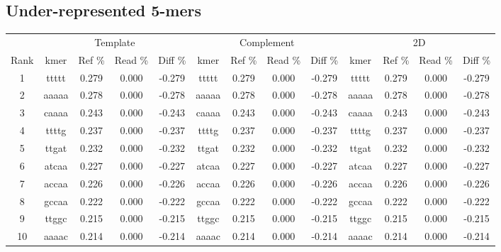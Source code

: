 \documentclass[a4paper,11pt,oneside]{article}
\begin{document}
\subsection*{Under-represented 5-mers}
\vspace{-3mm}
\begin{table}[H]
{\footnotesize
\fontsize{7pt}{9pt}\selectfont
\begin{tabular}{|c|c c c c|c c c c|c c c c|}
\cline{1-13}
 & \multicolumn{4}{c|}{Template} & \multicolumn{4}{c|}{Complement} & \multicolumn{4}{c|}{2D} \\
Rank & kmer & Ref \% & Read \% & Diff \% & kmer & Ref \% & Read \% & Diff \% & kmer & Ref \% & Read \% & Diff \% \\
\cline{1-13}
1 & ttttt & 0.279 & 0.000 & -0.279 & ttttt & 0.279 & 0.000 & -0.279 & ttttt & 0.279 & 0.000 & -0.279 \\
2 & aaaaa & 0.278 & 0.000 & -0.278 & aaaaa & 0.278 & 0.000 & -0.278 & aaaaa & 0.278 & 0.000 & -0.278 \\
3 & caaaa & 0.243 & 0.000 & -0.243 & caaaa & 0.243 & 0.000 & -0.243 & caaaa & 0.243 & 0.000 & -0.243 \\
4 & ttttg & 0.237 & 0.000 & -0.237 & ttttg & 0.237 & 0.000 & -0.237 & ttttg & 0.237 & 0.000 & -0.237 \\
5 & ttgat & 0.232 & 0.000 & -0.232 & ttgat & 0.232 & 0.000 & -0.232 & ttgat & 0.232 & 0.000 & -0.232 \\
6 & atcaa & 0.227 & 0.000 & -0.227 & atcaa & 0.227 & 0.000 & -0.227 & atcaa & 0.227 & 0.000 & -0.227 \\
7 & accaa & 0.226 & 0.000 & -0.226 & accaa & 0.226 & 0.000 & -0.226 & accaa & 0.226 & 0.000 & -0.226 \\
8 & gccaa & 0.222 & 0.000 & -0.222 & gccaa & 0.222 & 0.000 & -0.222 & gccaa & 0.222 & 0.000 & -0.222 \\
9 & ttggc & 0.215 & 0.000 & -0.215 & ttggc & 0.215 & 0.000 & -0.215 & ttggc & 0.215 & 0.000 & -0.215 \\
10 & aaaac & 0.214 & 0.000 & -0.214 & aaaac & 0.214 & 0.000 & -0.214 & aaaac & 0.214 & 0.000 & -0.214 \\
\cline{1-13}
\end{tabular}
}
\end{table}
\vspace{-3mm}
\end{document}
